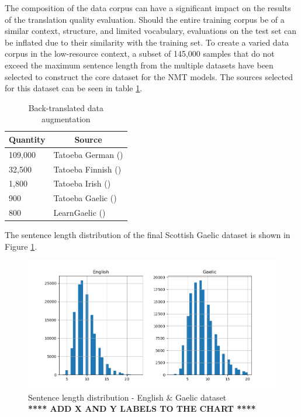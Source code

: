 The composition of the data corpus can have a significant impact on the results of the translation quality evaluation. Should the entire training corpus be of a similar context, structure, and limited vocabulary, evaluations on the test set can be inflated due to their similarity with the training set.
To create a varied data corpus in the low-resource context, a subset of 145,000 samples that do not exceed the maximum sentence length from the multiple datasets have been selected to construct the core dataset for the \acrshort{NMT} models. The sources selected for this dataset can be seen in table \ref{tab:low_resource-data}.

\begin{table}[!ht]
\centering
\begin{tabular}{|l|l|}
\hline
\multicolumn{1}{|c|}{\textbf{Quantity}} & \multicolumn{1}{|c|}{\textbf{Source}} \\ \hline
109,000  & Tatoeba German (\cite{tatoeba_data_2020}) \\ \hline %
32,500  & Tatoeba Finnish (\cite{udacity_data_2020}) \\ \hline %
1,800   & Tatoeba Irish (\cite{tatoeba_data_2020}) \\ \hline
900     & Tatoeba Gaelic (\cite{tatoeba_data_2020}) \\ \hline
800     & LearnGaelic (\cite{learn_gaelic_2019}) \\ \hline
\end{tabular}
\captionsetup{justification=centering,font=Large}
\caption{Back-translated data augmentation}
\label{tab:low_resource-data}
\end{table}

The sentence length distribution of the final Scottish Gaelic dataset is shown in Figure \ref{fig:sentence_length-gaelic}.
\begin{figure}[ht!]
\centering
\includegraphics[width=1\textwidth]{media/methodology/sentence_length_gaelic.png}
\captionsetup{justification=centering,font=Large}
\caption[Diagram of the Scottish Gaelic dataset sentence length distribution]{Sentence length distribution - English \& Gaelic dataset \\ \textbf{**** ADD X AND Y LABELS TO THE CHART ****}}
\label{fig:sentence_length-gaelic}
\end{figure}


